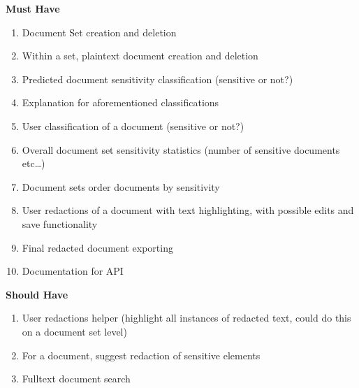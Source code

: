 \documentclass[\version]{l4proj}
\begin{document}
\begin{minipage}[t]{.5\linewidth}
    \centerline{\textbf{Must Have}}
    \begin{enumerate}[label=\textbf{M\arabic*}]
        \item Document Set creation and deletion
        \item Within a set, plaintext document creation and deletion
        \item Predicted document sensitivity classification (sensitive or not?)
        \item Explanation for aforementioned classifications
        \item User classification of a document (sensitive or not?)
        \item Overall document set sensitivity statistics (number of sensitive documents etc\ldots)
        \item Document sets order documents by sensitivity
        \item User redactions of a document with text highlighting, with possible edits and save functionality
        \item Final redacted document exporting
        \item Documentation for API
    \end{enumerate}
\end{minipage}
\hfill
\noindent
\begin{minipage}[t]{.5\linewidth}
    \centerline{\textbf{Should Have}}
    \begin{enumerate}[label=\textbf{S\arabic*}]
        \item User redactions helper (highlight all instances of redacted text, could do this on a document set level)
        \item For a document, suggest redaction of sensitive elements
        \item Fulltext document search
    \end{enumerate}
\end{minipage}

\vspace{0.5cm}
\end{document}
